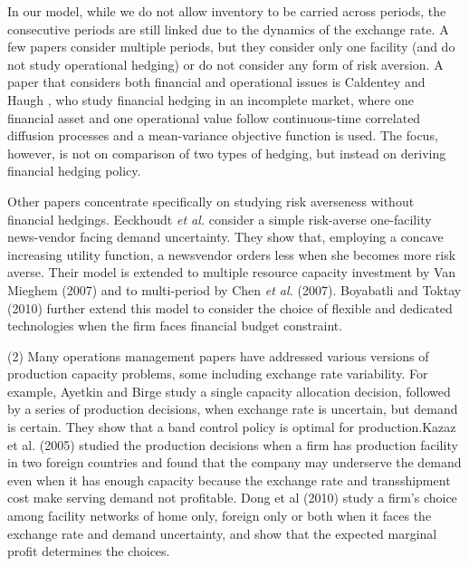 \documentclass[mnsc,nonblindrev,copyedit]{informs2_wz} %
\begin{document}
In our model, while we do not allow inventory to be carried across periods, the consecutive periods are still linked due to the dynamics of the exchange rate.  A few papers consider multiple periods, but they consider only one facility (and do not study operational hedging) or do not consider any form of risk aversion.  A paper that considers both financial and operational issues is Caldentey and Haugh \cite{Caldentey}, who study financial hedging in an incomplete market, where one financial asset and one operational value follow continuous-time correlated diffusion processes and a mean-variance objective function is used.  The focus, however, is not on comparison of two types of hedging, but instead on deriving financial hedging policy.  %

Other papers concentrate specifically on studying risk averseness without financial hedgings.  Eeckhoudt {\it et al.} \cite{Eeckhoudt1995} consider a simple risk-averse one-facility news-vendor facing demand uncertainty.  They show that, employing a concave increasing utility function, a newsvendor orders less when she becomes more risk averse. Their model is extended to multiple resource capacity investment by Van Mieghem (2007) and to multi-period by Chen {\it et al.} (2007). Boyabatli and Toktay (2010) further extend this model to consider the choice of flexible and dedicated technologies when the firm faces financial budget constraint.

\medskip


(2) Many operations management papers have addressed various versions of production capacity problems, some including exchange rate variability.  For example, Ayetkin and Birge \cite{Aytekin2004} study a single capacity allocation decision, followed by a series of production decisions, when exchange rate is uncertain, but demand is certain.  They show that a band control policy is optimal for production.Kazaz et al. (2005) studied the production decisions when a firm has production facility in two foreign countries and found that the company may underserve the demand even when it has enough capacity because the exchange rate and transshipment cost make serving demand not profitable. Dong et al (2010) study a firm's choice among facility networks of home only, foreign only or both when it faces the exchange rate and demand uncertainty, and show that the expected marginal profit determines the choices.

\medskip
\end{document}
